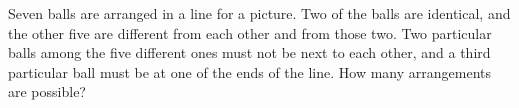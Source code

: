 Seven balls are arranged in a line for a picture. Two of the balls are identical, and the other five are different from each other and from those two. Two particular balls among the five different ones must not be next to each other, and a third particular ball must be at one of the ends of the line. How many arrangements are possible?
